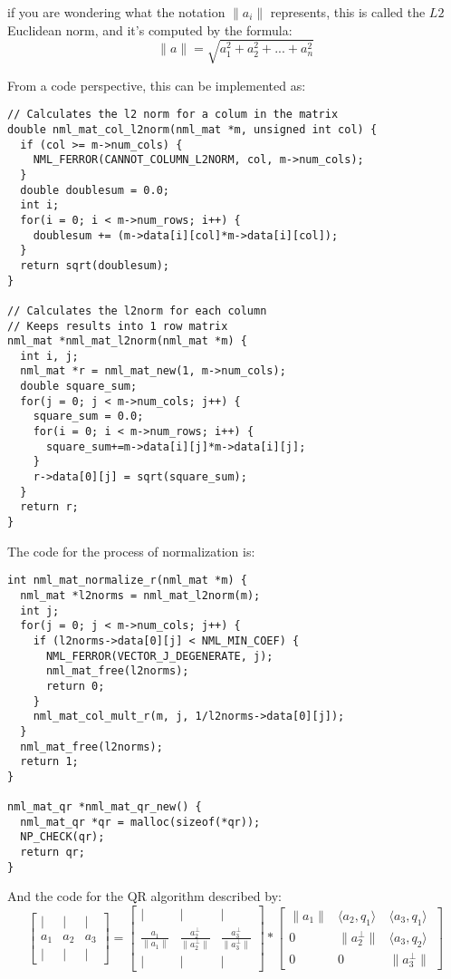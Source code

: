 if you are wondering what the notation $\parallel a_i \parallel$ represents, this is called the $L2$ Euclidean norm, and it's computed by the formula:
$$
\lVert a \rVert = \sqrt{a^{2}_{1} + a^{2}_{2} + ... + a^{2}_{n}}
$$

From a code perspective, this can be implemented as:

\begin{verbatim}
// Calculates the l2 norm for a colum in the matrix
double nml_mat_col_l2norm(nml_mat *m, unsigned int col) {
  if (col >= m->num_cols) {
    NML_FERROR(CANNOT_COLUMN_L2NORM, col, m->num_cols);
  }
  double doublesum = 0.0;
  int i;
  for(i = 0; i < m->num_rows; i++) {
    doublesum += (m->data[i][col]*m->data[i][col]);
  }
  return sqrt(doublesum);
}

// Calculates the l2norm for each column
// Keeps results into 1 row matrix
nml_mat *nml_mat_l2norm(nml_mat *m) {
  int i, j;
  nml_mat *r = nml_mat_new(1, m->num_cols);
  double square_sum;
  for(j = 0; j < m->num_cols; j++) {
    square_sum = 0.0;
    for(i = 0; i < m->num_rows; i++) {
      square_sum+=m->data[i][j]*m->data[i][j];
    }
    r->data[0][j] = sqrt(square_sum);
  }
  return r;
} 
\end{verbatim}

The code for the process of normalization is:

\begin{verbatim}
int nml_mat_normalize_r(nml_mat *m) {
  nml_mat *l2norms = nml_mat_l2norm(m);
  int j;
  for(j = 0; j < m->num_cols; j++) {
    if (l2norms->data[0][j] < NML_MIN_COEF) {
      NML_FERROR(VECTOR_J_DEGENERATE, j);
      nml_mat_free(l2norms);
      return 0;
    }
    nml_mat_col_mult_r(m, j, 1/l2norms->data[0][j]);
  }
  nml_mat_free(l2norms);
  return 1;
}

nml_mat_qr *nml_mat_qr_new() {
  nml_mat_qr *qr = malloc(sizeof(*qr));
  NP_CHECK(qr);
  return qr;
}
\end{verbatim}

And the code for the QR algorithm described by:
$$
\begin{bmatrix}
| & | & | \\
a_{1} & a_{2} & a_{3} \\
| & | & |
\end{bmatrix}
=
\begin{bmatrix}
| & | & | \\
\frac{a_{1}}{\lVert a_{1} \rVert} & \frac{a^{\bot}_{2}}{\lVert a^{\bot}_{2} \rVert} & \frac{a^{\bot}_{3}}{\lVert a^{\bot}_{3} \rVert} \\
| & | & |
\end{bmatrix}
*
\begin{bmatrix}
\lVert a_{1} \rVert &  \langle a_{2}, q_{1} \rangle & \langle a_{3}, q_{1} \rangle \\
0 & \lVert a^{\bot}_{2} \rVert &  \langle a_{3}, q_{2} \rangle \\
0 & 0 & \lVert a^{\bot}_{3} \rVert
\end{bmatrix}
$$

